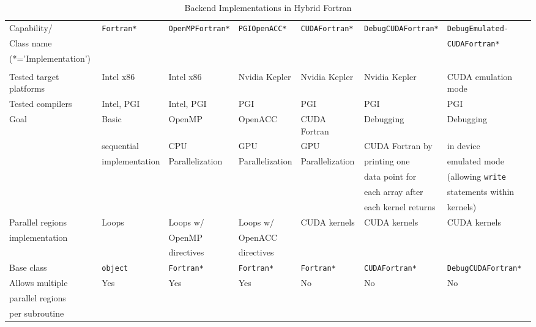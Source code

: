\tabcolsep=0.11cm
\begin{table}
        \centering
        \footnotesize
        \begin{tabular}{lllllll}
                Capability/ & \verb|Fortran*| & \verb|OpenMPFortran*| & \verb|PGIOpenACC*| & \verb|CUDAFortran*| & \verb|DebugCUDAFortran*| & \verb|DebugEmulated-| \\
                Class name & & & & & & \verb|CUDAFortran*| \\
                (*='Implementation') & & & & & & \\
                \\
                \hline \hline
                Tested target platforms & Intel x86 & Intel x86 & Nvidia Kepler & Nvidia Kepler & Nvidia Kepler & CUDA emulation mode \\
                \hline
                Tested compilers & Intel, PGI & Intel, PGI & PGI & PGI & PGI & PGI \\
                \hline
                Goal & Basic & OpenMP & OpenACC & CUDA Fortran & Debugging & Debugging \\
                & sequential & CPU & GPU & GPU & CUDA Fortran by & in device \\
                & implementation & Parallelization & Parallelization  & Parallelization & printing one & emulated mode \\
                & & & & & data point for & (allowing \verb|write| \\
                & & & & & each array after & statements within \\
                & & & & & each kernel returns & kernels) \\
                \hline
                Parallel regions & Loops & Loops w/ & Loops w/ & CUDA kernels & CUDA kernels & CUDA kernels \\
                implementation & & OpenMP & OpenACC & & & \\
                & & directives & directives & & & \\
                \hline
                Base class & \verb|object| & \verb|Fortran*| & \verb|Fortran*| & \verb|Fortran*| & \verb|CUDAFortran*| & \verb|DebugCUDAFortran*| \\
                \hline
                Allows multiple & Yes & Yes & Yes & No & No & No \\
                parallel regions & & & & & & \\
                per subroutine & & & & & & \\                
                \hline \hline            
        \end{tabular}
        \caption{Backend Implementations in Hybrid Fortran}
        \label{table:backendImplementationComparison}
\end{table}

